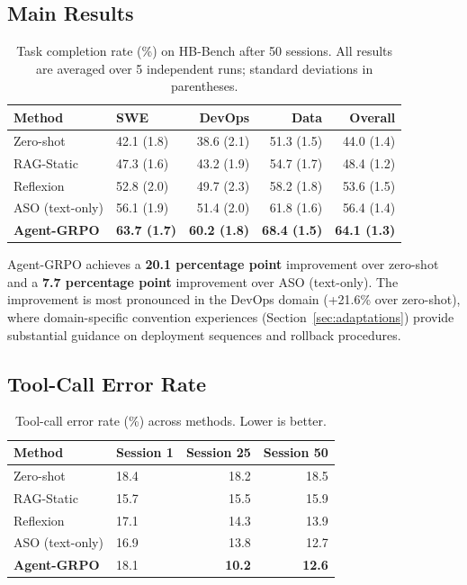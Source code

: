 \documentclass[11pt]{article}
\begin{document}
\subsection{Main Results}

\begin{table}[H]
\centering
\caption{Task completion rate (\%) on HB-Bench after 50 sessions. All results
are averaged over 5 independent runs; standard deviations in parentheses.}
\label{tab:main-results}
\begin{tabularx}{\textwidth}{lXrrr}
\toprule
\textbf{Method} & \textbf{SWE} & \textbf{DevOps} & \textbf{Data} & \textbf{Overall} \\
\midrule
Zero-shot           & 42.1 (1.8) & 38.6 (2.1) & 51.3 (1.5) & 44.0 (1.4) \\
RAG-Static          & 47.3 (1.6) & 43.2 (1.9) & 54.7 (1.7) & 48.4 (1.2) \\
Reflexion           & 52.8 (2.0) & 49.7 (2.3) & 58.2 (1.8) & 53.6 (1.5) \\
ASO (text-only)     & 56.1 (1.9) & 51.4 (2.0) & 61.8 (1.6) & 56.4 (1.4) \\
\textbf{Agent-GRPO} & \textbf{63.7 (1.7)} & \textbf{60.2 (1.8)} & \textbf{68.4 (1.5)} & \textbf{64.1 (1.3)} \\
\bottomrule
\end{tabularx}
\end{table}

Agent-GRPO achieves a \textbf{20.1 percentage point} improvement over zero-shot
and a \textbf{7.7 percentage point} improvement over ASO (text-only). The
improvement is most pronounced in the DevOps domain (+21.6\% over zero-shot),
where domain-specific convention experiences (Section~\ref{sec:adaptations})
provide substantial guidance on deployment sequences and rollback procedures.

\subsection{Tool-Call Error Rate}

\begin{table}[H]
\centering
\caption{Tool-call error rate (\%) across methods. Lower is better.}
\label{tab:error-rate}
\begin{tabularx}{\textwidth}{lXrr}
\toprule
\textbf{Method} & \textbf{Session 1} & \textbf{Session 25} & \textbf{Session 50} \\
\midrule
Zero-shot           & 18.4 & 18.2 & 18.5 \\
RAG-Static          & 15.7 & 15.5 & 15.9 \\
Reflexion           & 17.1 & 14.3 & 13.9 \\
ASO (text-only)     & 16.9 & 13.8 & 12.7 \\
\textbf{Agent-GRPO} & 18.1 & \textbf{10.2} & \textbf{12.6} \\
\bottomrule
\end{tabularx}
\end{table}
\end{document}
